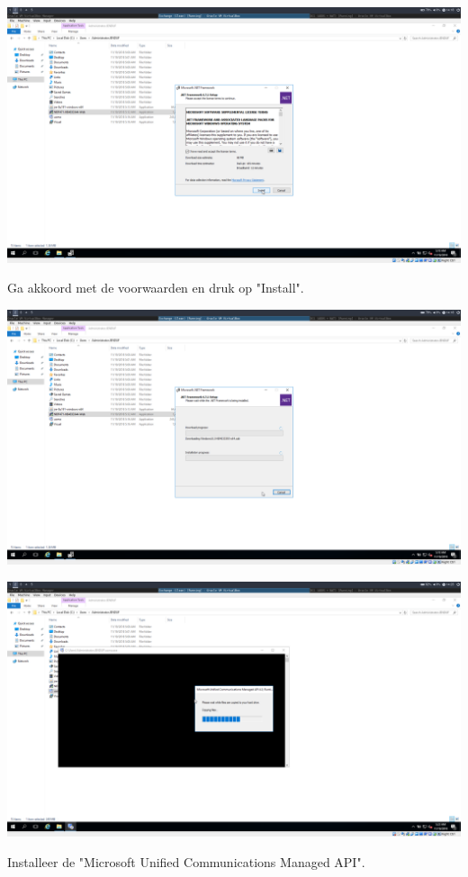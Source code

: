 \documentclass[a4paper]{article}
\begin{document}
	\begin{center}
	\includegraphics[width=15cm]{Pictures/Exchange/Pre/1542633503.png}
	
		Ga akkoord met de voorwaarden en druk op "Install".
\end{center}
	\begin{center}
	\includegraphics[width=15cm]{Pictures/Exchange/Pre/1542633506.png}
\end{center}
	\begin{center}
	\includegraphics[width=15cm]{Pictures/Exchange/Pre/1542633791.png}
	
	Installeer de "Microsoft Unified Communications Managed API".
\end{center}
\end{document}
